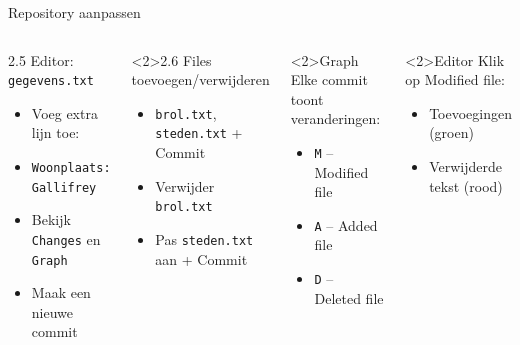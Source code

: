 \documentclass
[kulak,outline] %
{kulakbeamer}
\begin{document}
\begin{frame}{Repository aanpassen}
		\begin{columns}[T]
			\begin{block}{2.5 Editor: \texttt{gegevens.txt}}
				\begin{itemize}
				\item Voeg extra lijn toe:
				\item[] \texttt{Woonplaats: Gallifrey}
				\item Bekijk \texttt{Changes} en \texttt{Graph}
				\item Maak een nieuwe commit
				\end{itemize}
			\end{block}

			\begin{block}<2>{2.6 Files toevoegen/verwijderen}
				\begin{itemize}
				\item 
                \texttt{brol.txt}, \texttt{steden.txt} + Commit
				\item Verwijder \texttt{brol.txt}
				\item Pas \texttt{steden.txt} aan + Commit
				\end{itemize}
			\end{block}
	
			\begin{exampleblock}<2>{Graph}
				Elke commit toont veranderingen:
				\begin{itemize}
					\item \texttt{M} -- Modified file
					\item \texttt{A} -- Added file
					\item \texttt{D} -- Deleted file
				\end{itemize}
			\end{exampleblock}

			\begin{exampleblock}<2>{Editor}
			Klik op Modified file:
				\begin{itemize}
				\item Toevoegingen (groen)
				\item Verwijderde tekst (rood)
				\end{itemize}
		\end{exampleblock}
		\end{columns}
	\end{frame}
\end{document}

